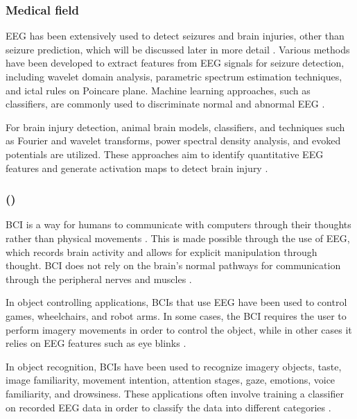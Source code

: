 \subsubsection{Medical field}
\gls{EEG} has been extensively used to detect seizures and brain injuries, other than seizure prediction, which will be discussed later in more detail \cite{lai_literature_2018}. 
Various methods have been developed to extract features from \gls{EEG} signals for seizure detection, including wavelet domain analysis, parametric spectrum estimation techniques, and ictal rules on Poincare plane. Machine learning approaches, such as classifiers, are commonly used to discriminate normal and abnormal \gls{EEG} \cite{sharmila_epilepsy_2018}. 

For brain injury detection, animal brain models, classifiers, and techniques such as Fourier and wavelet transforms, power spectral density analysis, and evoked potentials are utilized. These approaches aim to identify quantitative \gls{EEG} features and generate activation maps to detect brain injury \cite{ianof_traumatic_2017, rapp_traumatic_2015}.


\subsubsection{ ()}
\gls{BCI} is a way for humans to communicate with computers through their thoughts rather than physical movements \cite{lai_literature_2018}. This is made possible through the use of \gls{EEG}, which records brain activity and allows for explicit manipulation through thought. \gls{BCI} does not rely on the brain's normal pathways for communication through the peripheral nerves and muscles \cite{machado_eeg-based_2010}.

In object controlling applications, \glspl{BCI} that use \gls{EEG} have been used to control games, wheelchairs, and robot arms. In some cases, the \gls{BCI} requires the user to perform imagery movements in order to control the object, while in other cases it relies on \gls{EEG} features such as eye blinks \cite{huang_review_2021, liao_gaming_2012, al-qaysi_review_2018}.

In object recognition, \glspl{BCI} have been used to recognize imagery objects, taste, image familiarity, movement intention, attention stages, gaze, emotions, voice familiarity, and drowsiness. These applications often involve training a classifier on recorded \gls{EEG} data in order to classify the data into different categories \cite{mohedano_exploring_2015}.

